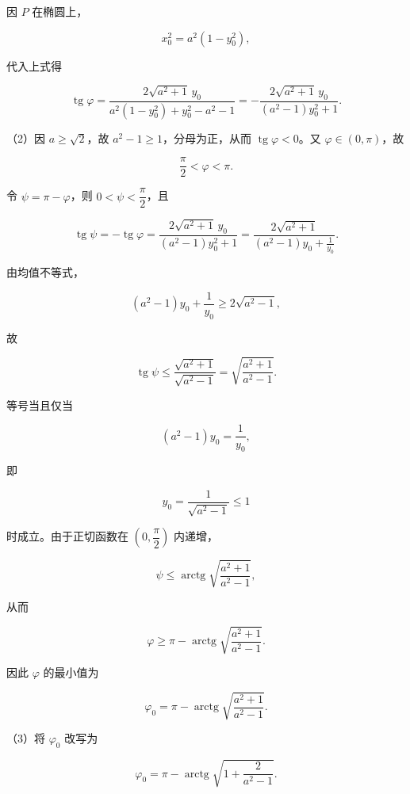 \begin{answer}
因 $P$ 在椭圆上，

\nopagebreak[4]
\[
x_0^2=a^2(1-y_0^2),
\]

代入上式得

\nopagebreak[4]
\[
\operatorname{tg}\varphi
=\frac{2\sqrt{a^2+1}\,y_0}
{a^2(1-y_0^2)+y_0^2-a^2-1}
=-\frac{2\sqrt{a^2+1}\,y_0}
{(a^2-1)y_0^2+1}.
\]

（2）因 $a\ge\sqrt2$，故 $a^2-1\ge1$，分母为正，从而 $\operatorname{tg}\varphi<0$。又 $\varphi\in(0,\pi)$，故

\nopagebreak[4]
\[
\frac{\pi}{2}<\varphi<\pi.
\]

令 $\psi=\pi-\varphi$，则 $0<\psi<\dfrac{\pi}{2}$，且

\nopagebreak[4]
\[
\operatorname{tg}\psi=-\operatorname{tg}\varphi
=\frac{2\sqrt{a^2+1}\,y_0}{(a^2-1)y_0^2+1}
=\frac{2\sqrt{a^2+1}}
{(a^2-1)y_0+\frac{1}{y_0}}.
\]

由均值不等式，

\nopagebreak[4]
\[
(a^2-1)y_0+\frac{1}{y_0}\ge2\sqrt{a^2-1},
\]

故

\nopagebreak[4]
\[
\operatorname{tg}\psi\le
\frac{\sqrt{a^2+1}}{\sqrt{a^2-1}}
=\sqrt{\frac{a^2+1}{a^2-1}}.
\]

等号当且仅当

\nopagebreak[4]
\[
(a^2-1)y_0=\frac{1}{y_0},
\]

即

\nopagebreak[4]
\[
y_0=\frac{1}{\sqrt{a^2-1}}\le1
\]

时成立。由于正切函数在 $\left(0,\dfrac{\pi}{2}\right)$ 内递增，

\nopagebreak[4]
\[
\psi\le\operatorname{arctg}\sqrt{\frac{a^2+1}{a^2-1}},
\]

从而

\nopagebreak[4]
\[
\varphi\ge\pi-\operatorname{arctg}\sqrt{\frac{a^2+1}{a^2-1}}.
\]

因此 $\varphi$ 的最小值为

\nopagebreak[4]
\[
\varphi_0=\pi-\operatorname{arctg}\sqrt{\frac{a^2+1}{a^2-1}}.
\]

（3）将 $\varphi_0$ 改写为

\nopagebreak[4]
\[
\varphi_0=\pi-\operatorname{arctg}\sqrt{1+\frac{2}{a^2-1}}.
\]


\end{answer}
